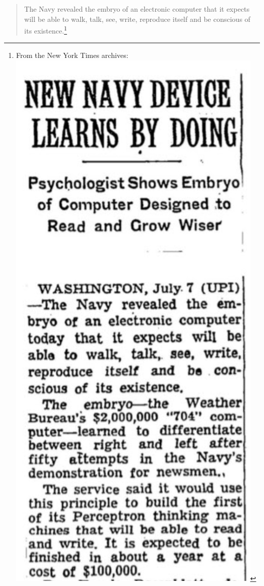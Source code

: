 \documentclass{tufte-book}
\begin{document}
\begin{quote}
The Navy revealed the embryo of an electronic computer that it expects
will be able to walk, talk, see, write, reproduce itself and be
conscious of its existence.\footnote{From the New York Times archives:
  \includegraphics{assets/navy-device.jpg}}
\end{quote}
\end{document}
